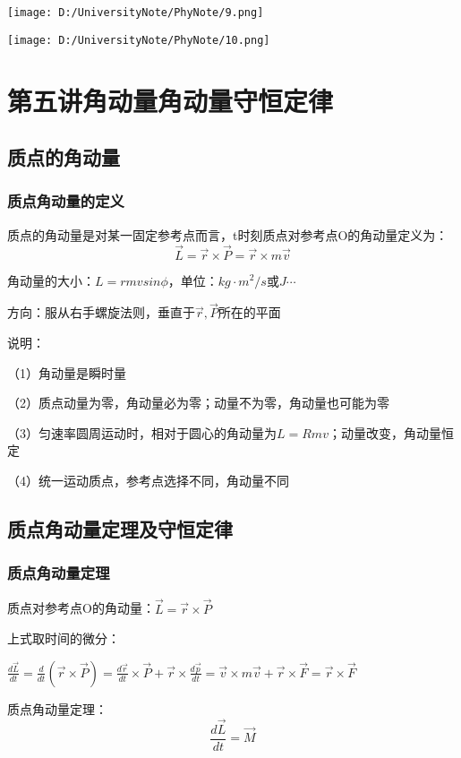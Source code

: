 \documentclass[UTF8]{article}
\begin{document}
    \texttt{[image: D:/UniversityNote/PhyNote/9.png]}

    \texttt{[image: D:/UniversityNote/PhyNote/10.png]}

\newpage
\section{第五讲\;\;角动量\;\;角动量守恒定律}
\subsection{质点的角动量}
\subsubsection{质点角动量的定义}

    质点的角动量是对某一固定参考点而言，t时刻质点对参考点O的角动量定义为：
    \[\vec{L} = \vec{r}\times\vec{P} = \vec{r}\times m\vec{v}\]

    角动量的大小：$L = rmvsin\phi$，单位：$kg\cdot m^2/s$或$J\cdots$

    方向：服从右手螺旋法则，垂直于$\vec{r},\vec{P}$所在的平面

    说明：

    （1）角动量是瞬时量

    （2）质点动量为零，角动量必为零；动量不为零，角动量也可能为零

    （3）匀速率圆周运动时，相对于圆心的角动量为$L = Rmv$；动量改变，角动量恒定

    （4）统一运动质点，参考点选择不同，角动量不同

\subsection{质点角动量定理及守恒定律}
\subsubsection{质点角动量定理}

    质点对参考点O的角动量：$\vec{L} = \vec{r}\times\vec{P}$

    上式取时间的微分：
    
    $\frac{d\vec{L}}{dt} = \frac{d}{dt}(\vec{r}\times\vec{P}) = \frac{d\vec{r}}{dt}\times\vec{P} + \vec{r}\times\frac{d\vec{p}}{dt} = \vec{v}\times m\vec{v} + \vec{r}\times\vec{F} = \vec{r}\times\vec{F}$

    质点角动量定理：\[\frac{d\vec{L}}{dt} = \vec{M}\]
\end{document}
